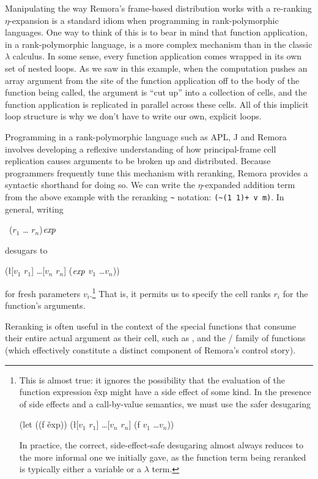 Manipulating the way Remora's frame-based distribution works with
a re-ranking $\eta$-expansion is a standard idiom when programming
in rank-po\-ly\-mor\-phic languages.
One way to think of this is to bear in mind that function application,
in a rank-polymorphic language, is a more complex mechanism
than in the classic $\lambda$ calculus.
In some sense, every function application comes wrapped in its
own set of nested loops.
As we saw in this example,
when the computation pushes an array argument from the site
of the function application off to the body of the function being called,
the argument is ``cut up'' into a collection of cells, 
and the function application is replicated in parallel across these cells.
All of this implicit loop structure is why we don't have to write
our own, explicit loops.

Programming in a rank-polymorphic language such as APL, J and Remora
involves developing a reflexive understanding of how principal-frame
cell replication causes arguments to be broken up and distributed.
Because programmers frequently tune this mechanism with reranking,
Remora provides a syntactic shorthand for doing so.
We can write the $\eta$-expanded addition term from the above example
with the reranking \verb|~| notation:
\verb|(~(1 1)+ v m)|.
In general, writing
\begin{code}\cdmath\cddollar
~($r_1$ {\ldots} $r_n$)$\mathit{exp}$\end{code}
desugars to
\begin{code}\cdmath
(\l{[$v_1$ $r_1$] \ldots [$v_n$ $r_n$]} ($\mathit{exp}$ $v_1$ \ldots $v_n$))\end{code}
for fresh parameters $v_i$.\footnote{
This is almost true: it ignores the possibility that the evaluation of the
function expression \v{exp} might have a side effect of some kind.
In the presence of side effects and a call-by-value semantics,
we must use the safer desugaring
\begin{code}\cdmath
(let ((f \v{exp}))
  (\l{[$v_1$ $r_1$] \ldots [$v_n$ $r_n$]} (f $v_1$ \ldots $v_n$))\end{code}
In practice, the correct, side-effect-safe desugaring almost always
reduces to the more informal one we initially gave,
as the function term being reranked is typically either
a variable or a $\lambda$ term.}
That is, it permits us to specify the cell ranks $r_i$ for the
function's arguments.

Reranking is often useful in the context of the special functions
that consume their entire actual argument as their cell,
such as ,  and the /
family of functions
(which effectively constitute a distinct component of Remora's control story).

